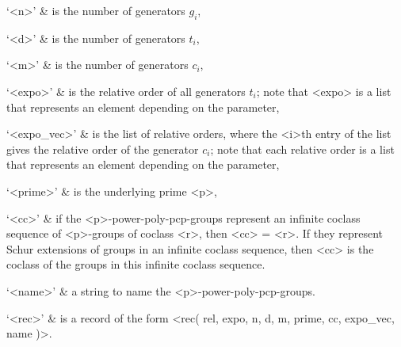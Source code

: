 `<n>' & is the number of generators $g_i$, 

`<d>' & is the number of generators $t_i$, 

`<m>' & is the number of generators $c_i$, 

`<expo>' & is the relative order of all generators $t_i$; note that <expo> is
a list that represents an element depending on the parameter,

`<expo_vec>' & is the list of relative orders, where the <i>th entry of the 
list gives the relative order of the generator $c_i$; note that each 
relative order is a list that represents an element depending on the 
parameter, 

`<prime>' & is the underlying prime <p>,

`<cc>' & if the <p>-power-poly-pcp-groups represent an infinite coclass
sequence of <p>-groups of coclass <r>, then <cc> = <r>. If they represent
Schur extensions of groups in an infinite coclass sequence, then <cc> is
the coclass of the groups in this infinite coclass sequence.

`<name>' & a string to name the <p>-power-poly-pcp-groups. 

`<rec>' & is a record of the form
<rec( rel, expo, n, d, m, prime, cc, expo_vec, name )>. 
\enditems

